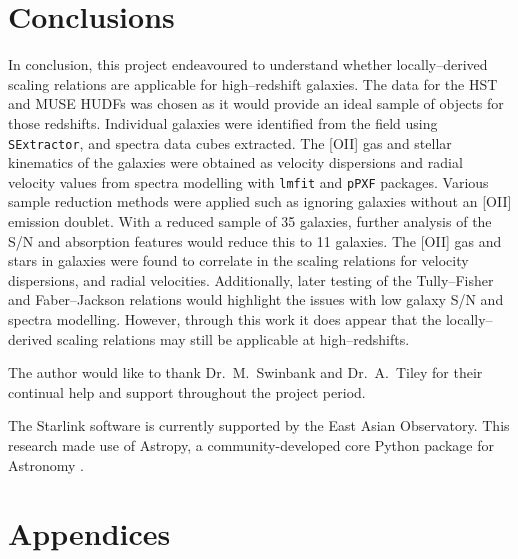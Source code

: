 \documentclass[12pt, twocolumn, nofootinbib]{revtex4-1}    %
\begin{document}
\vspace{2ex} %
\section{Conclusions} \label{sec:conclusions}
\noindent
In conclusion, this project endeavoured to understand whether locally--derived scaling relations are applicable for high--redshift galaxies. The data for the HST and MUSE HUDFs was chosen as it would provide an ideal sample of objects for those redshifts. Individual galaxies were identified from the field using \texttt{SExtractor}, and spectra data cubes extracted. The [OII] gas and stellar kinematics of the galaxies were obtained as velocity dispersions and radial velocity values from spectra modelling with \texttt{lmfit} and \texttt{pPXF} packages. Various sample reduction methods were applied such as ignoring galaxies without an [OII] emission doublet. With a reduced sample of 35 galaxies, further analysis of the S/N and absorption features would reduce this to 11 galaxies. The [OII] gas and stars in galaxies were found to correlate in the scaling relations for velocity dispersions, and radial velocities. Additionally, later testing of the Tully--Fisher and Faber--Jackson relations would highlight the issues with low galaxy S/N and spectra modelling. However, through this work it does appear that the locally--derived scaling relations may still be applicable at high--redshifts.

\vspace{2ex} %
\begin{acknowledgments}
\noindent
The author would like to thank Dr.~M.~Swinbank and Dr.~A.~Tiley for their continual help and support throughout the project period.

The Starlink software \cite{2014ASPC..485..391C} is currently supported by the East Asian Observatory. This research made use of Astropy, a community-developed core Python package for Astronomy \citep{astropy:2013, astropy:2018}.
\end{acknowledgments}

\vspace{2ex} %



\clearpage

\appendix

\onecolumngrid
\section*{Appendices}
\end{document}
